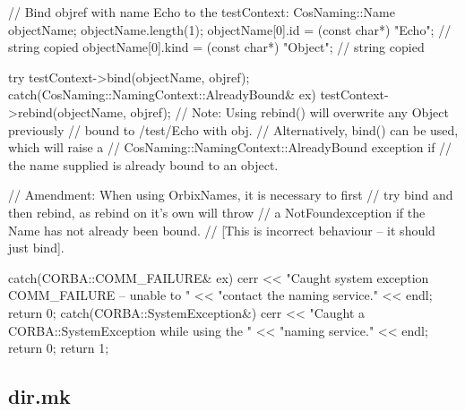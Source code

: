 \documentclass[11pt,twoside,a4paper]{book}
\begin{document}
\begin{cxxlisting}
{{    // Bind objref with name Echo to the testContext:
    CosNaming::Name objectName;
    objectName.length(1);
    objectName[0].id   = (const char*) "Echo";   // string copied
    objectName[0].kind = (const char*) "Object"; // string copied

    try {
      testContext->bind(objectName, objref);
    }
    catch(CosNaming::NamingContext::AlreadyBound& ex) {
      testContext->rebind(objectName, objref);
    }
    // Note: Using rebind() will overwrite any Object previously
    //       bound to /test/Echo with obj.
    //       Alternatively, bind() can be used, which will raise a
    //       CosNaming::NamingContext::AlreadyBound exception if
    //       the name supplied is already bound to an object.

    // Amendment: When using OrbixNames, it is necessary to first
    // try bind and then rebind, as rebind on it's own will throw
    // a NotFoundexception if the Name has not already been bound.
    // [This is incorrect behaviour -- it should just bind].
  }
  catch(CORBA::COMM_FAILURE& ex) {
    cerr << "Caught system exception COMM_FAILURE -- unable to "
         << "contact the naming service." << endl;
    return 0;
  }
  catch(CORBA::SystemException&) {
    cerr << "Caught a CORBA::SystemException while using the "
         << "naming service." << endl;
    return 0;
  }
  return 1;
}
\end{cxxlisting}


\clearpage
\subsection{dir.mk}
\end{document}
